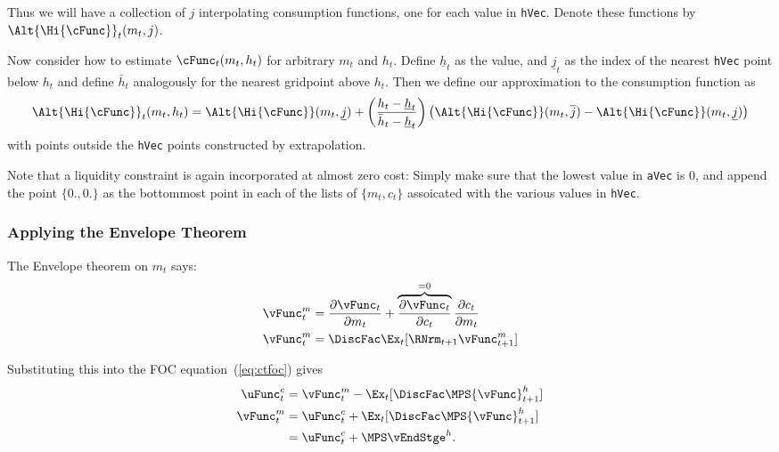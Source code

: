 \documentclass[titlepage, headings=optiontotocandhead]{\econtex}
\begin{document}
{  Thus we will have a collection of $j$ interpolating consumption
  functions, one for each value in \texttt{hVec}.  Denote these
  functions by $\Alt{\Hi{\cFunc}}_{t}({m}_{t},j)$.

  Now consider how to estimate $\cFunc_{t}({m}_{t},h_{t})$ for arbitrary
  ${m}_{t}$ and $h_{t}$.  Define $\underline{h}_{t}$ as the value, and
  $\underline{j}_{t}$ as the index of the nearest \texttt{hVec} point
  below $h_{t}$ and define $\bar{h}_{t}$ analogously for the nearest
  gridpoint above $h_{t}$.  Then we define our approximation to the
  consumption function as
  \begin{displaymath}
    \Alt{\Hi{\cFunc}}_{t}({m}_{t},h_{t}) =
    \Alt{\Hi{\cFunc}}({m}_{t},\underline{j})+\left(\frac{h_{t}-\underline{h}_{t}}
      {\bar{h}_{t}-\underline{h}_{t}}\right)
    \left(\Alt{\Hi{\cFunc}}({m}_{t},\overline{j})
      -\Alt{\Hi{\cFunc}}({m}_{t},\underline{j})\right)
  \end{displaymath}
  with points outside the \texttt{hVec} points constructed by
  extrapolation.

  Note that a liquidity constraint is again incorporated at almost
  zero cost: Simply make sure that the lowest value in
  \texttt{aVec} is 0, and append the point $\{0.,0.\}$ as the
  bottommost point in each of the lists of $\{{m}_{t},{c}_{t}\}$
  assoicated with the various values in \texttt{hVec}.

  \hypertarget{Applying-the-Envelope-Theorem}{}
  \subsubsection{Applying the Envelope Theorem}
  The Envelope theorem on ${m}_{t}$ says:
  \begin{equation}\begin{gathered}\begin{aligned}
        {\vFunc}^{m}_{t}  & = \frac{\partial {\vFunc}_{t}}{\partial {m}_{t}} + \overbrace{\frac{\partial {\vFunc}_{t}}{\partial {c}_{t}}}^{=0}\frac{\partial {c}_{t}}{\partial {m}_{t}} \label{eq:vxt} \\
        {\vFunc}_{t}^{m}  & = \DiscFac  \Ex_{t} [\RNrm_{t+1} {\vFunc}_{t+1}^{m}] \label{eq:envelopex}
      \end{aligned}\end{gathered}\end{equation}

  Substituting this into the FOC equation~(\ref{eq:ctfoc}) gives
  \begin{equation}\begin{gathered}\begin{aligned}
        \uFunc^{c}_{t}  & = {\vFunc}_{t}^{m}-\Ex_{t}[\DiscFac \MPS {\vFunc}_{t+1}^{h}] \label{eq:ctfocsubx}
        \\ {\vFunc}_{t}^{m}  & = \uFunc^{c}_{t}+\Ex_{t}[\DiscFac \MPS {\vFunc}_{t+1}^{h}] \label{eq:vtfoc}
        \\            & = \uFunc^{c}_{t}+\MPS \vEndStge^{h} \label{eq:vxtformula}.
      \end{aligned}\end{gathered}\end{equation}

}
\end{document}
